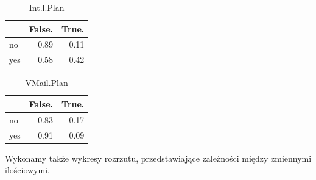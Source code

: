 \documentclass{article}\usepackage[]{graphicx}\usepackage[]{color}
\newenvironment{knitrout}{}{} %
\begin{document}
\begin{knitrout}
\color{fgcolor}\begin{table}[!h]

\caption{\label{tab:Ilosciowe z podzialem na grupy}Int.l.Plan}
\centering
\begin{tabular}[t]{l|r|r}
\hline
  & False. & True.\\
\hline
no & 0.89 & 0.11\\
\hline
yes & 0.58 & 0.42\\
\hline
\end{tabular}
\end{table}

\begin{table}[!h]

\caption{\label{tab:Ilosciowe z podzialem na grupy}VMail.Plan}
\centering
\begin{tabular}[t]{l|r|r}
\hline
  & False. & True.\\
\hline
no & 0.83 & 0.17\\
\hline
yes & 0.91 & 0.09\\
\hline
\end{tabular}
\end{table}


\end{knitrout}

Wykonamy także wykresy rozrzutu, przedstawiające zależności między zmiennymi ilościowymi.
\end{document}
